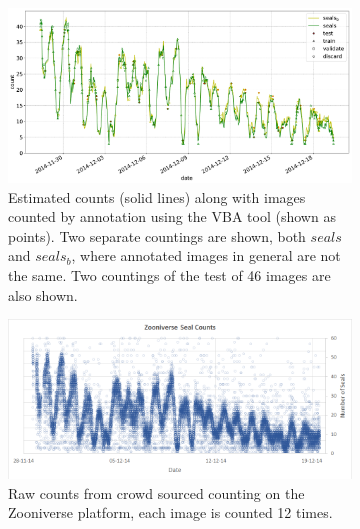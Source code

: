  
\begin{figure}[pht!]
    \centering
    
    \begin{subfigure}[t]{1.0\linewidth}
    \includegraphics[width=1.0\linewidth]{charts/seals/seals_combined.pdf}
    \caption{Estimated counts (solid lines) along with images counted by annotation using the \gls{VBA} tool (shown as points). Two separate countings are shown, both $seals$ and $seals_b$, where annotated images in general are not the same. Two countings of the test of 46 images are also shown. }
    \label{fig:turtle_rock}
    \end{subfigure}
    
    
    \begin{subfigure}[t]{1.0\linewidth}
    \includegraphics[width=1.0\linewidth]{figures/annotation/zooniverse.png}
    \caption{Raw counts from crowd sourced counting on the Zooniverse \cite{Zooniverse} platform, each image is counted 12 times. \cite{Eisert2017}}
    \label{fig:zooniverse_counts}
    \end{subfigure}
    
    \caption{}
    \label{fig:seals_timeseries}
\end{figure} 




